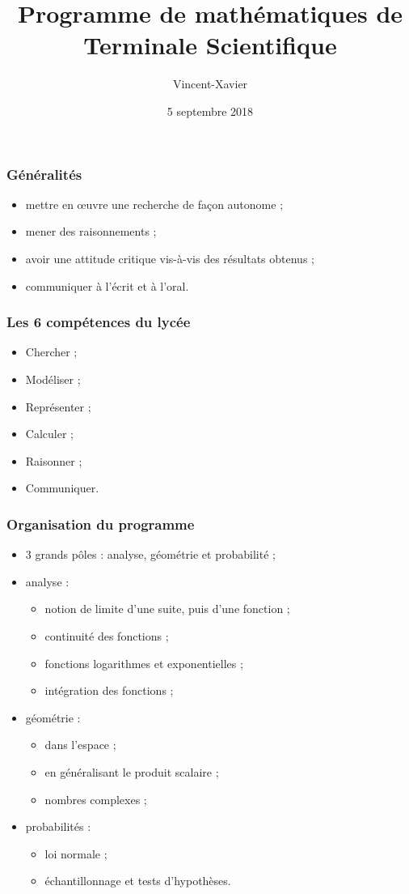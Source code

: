 \documentclass[frenchb]{beamer}
\title{Programme de mathématiques de Terminale Scientifique}
\author{Vincent-Xavier \bsc{Jumel}}
\institute{LaSalle Saint-Denis}
\date{5 septembre 2018}
\begin{document}
\begin{frame}
  \maketitle
\end{frame}

\begin{frame}
  \frametitle{Généralités}
  \begin{itemize}
    \item mettre en œuvre une recherche de façon autonome ;
    \item mener des raisonnements ;
    \item avoir une attitude critique vis-à-vis des résultats obtenus ;
    \item communiquer à l'écrit et à l'oral.
  \end{itemize}
\end{frame}

\begin{frame}
  \frametitle{Les 6 compétences du lycée}
  \begin{itemize}[<+->]
    \item Chercher ;
    \item Modéliser ;
    \item Représenter ;
    \item Calculer ;
    \item Raisonner ;
    \item Communiquer.
  \end{itemize}
\end{frame}

\begin{frame}
  \frametitle{Organisation du programme}
  \begin{itemize}[<+->]
    \item 3 grands pôles : analyse, géométrie et probabilité ;
    \item analyse :
      \begin{itemize}
        \item notion de limite d'une suite, puis d'une fonction ;
        \item continuité des fonctions ;
        \item fonctions logarithmes et exponentielles ;
        \item intégration des fonctions ;
      \end{itemize}
    \item géométrie :
      \begin{itemize}
        \item dans l'espace ;
        \item en généralisant le produit scalaire ;
        \item nombres complexes ;
      \end{itemize}
    \item probabilités :
      \begin{itemize}
        \item loi normale ;
        \item échantillonnage et tests d'hypothèses.
      \end{itemize}
  \end{itemize}
\end{frame}
\end{document}

